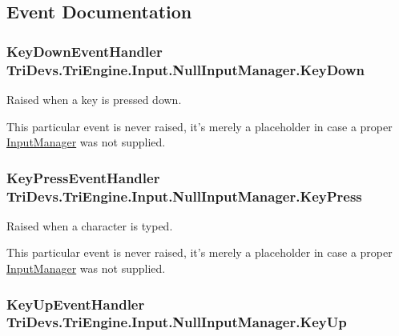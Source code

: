 \subsection{Event Documentation}
\hypertarget{class_tri_devs_1_1_tri_engine_1_1_input_1_1_null_input_manager_a66b8aadc2fef94dd289dcb03ae867ef2}{
\subsubsection[{Key\-Down}]{\setlength{\rightskip}{0pt plus 5cm}Key\-Down\-Event\-Handler Tri\-Devs.\-Tri\-Engine.\-Input.\-Null\-Input\-Manager.\-Key\-Down}}\label{class_tri_devs_1_1_tri_engine_1_1_input_1_1_null_input_manager_a66b8aadc2fef94dd289dcb03ae867ef2}


Raised when a key is pressed down. 

This particular event is never raised, it's merely a placeholder in case a proper \hyperlink{class_tri_devs_1_1_tri_engine_1_1_input_1_1_input_manager}{Input\-Manager} was not supplied. \hypertarget{class_tri_devs_1_1_tri_engine_1_1_input_1_1_null_input_manager_a97af4537020067883e27b956ff58e388}{
\subsubsection[{Key\-Press}]{\setlength{\rightskip}{0pt plus 5cm}Key\-Press\-Event\-Handler Tri\-Devs.\-Tri\-Engine.\-Input.\-Null\-Input\-Manager.\-Key\-Press}}\label{class_tri_devs_1_1_tri_engine_1_1_input_1_1_null_input_manager_a97af4537020067883e27b956ff58e388}


Raised when a character is typed. 

This particular event is never raised, it's merely a placeholder in case a proper \hyperlink{class_tri_devs_1_1_tri_engine_1_1_input_1_1_input_manager}{Input\-Manager} was not supplied. \hypertarget{class_tri_devs_1_1_tri_engine_1_1_input_1_1_null_input_manager_a672e80d4b26430b4663eb706f3a03d66}{
\subsubsection[{Key\-Up}]{\setlength{\rightskip}{0pt plus 5cm}Key\-Up\-Event\-Handler Tri\-Devs.\-Tri\-Engine.\-Input.\-Null\-Input\-Manager.\-Key\-Up}}\label{class_tri_devs_1_1_tri_engine_1_1_input_1_1_null_input_manager_a672e80d4b26430b4663eb706f3a03d66}


